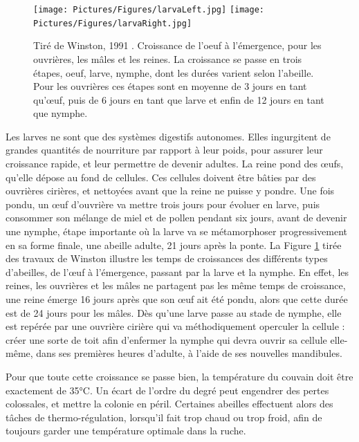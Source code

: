 			\begin{figure}
			\centering
			\texttt{[image: Pictures/Figures/larvaLeft.jpg]}
			\texttt{[image: Pictures/Figures/larvaRight.jpg]}
			\caption[Tirée de Winston, 1991 \cite{winston_biology_1991}. Croissance de l'oeuf à l'émergence, pour les ouvrières, les mâles et les reines.]{Tiré de Winston, 1991 \cite{winston_biology_1991}. Croissance de l'oeuf à l'émergence, pour les ouvrières, les mâles et les reines. La croissance se passe en trois étapes, oeuf, larve, nymphe, dont les durées varient selon l'abeille. Pour les ouvrières ces étapes sont en moyenne de 3 jours en tant qu'œuf, puis de 6 jours en tant que larve et enfin de 12 jours en tant que nymphe.}
			\label{LarvaDev}
			\end{figure}
			
			Les larves ne sont que des systèmes digestifs autonomes. Elles ingurgitent de grandes quantités de nourriture par rapport à leur poids, pour assurer leur croissance rapide, et leur permettre de devenir adultes. La reine pond des œufs, qu'elle dépose au fond de cellules. Ces cellules doivent être bâties par des ouvrières cirières, et nettoyées avant que la reine ne puisse y pondre. Une fois pondu, un œuf d'ouvrière va mettre trois jours pour évoluer en larve, puis consommer son mélange de miel et de pollen pendant six jours, avant de devenir une nymphe, étape importante où la larve va se métamorphoser progressivement en sa forme finale, une abeille adulte, 21 jours après la ponte. La Figure \ref{LarvaDev} tirée des travaux de Winston \cite{winston_biology_1991} illustre les temps de croissances des différents types d'abeilles, de l'œuf à l'émergence, passant par la larve et la nymphe. En effet, les reines, les ouvrières et les mâles ne partagent pas les même temps de croissance, une reine émerge 16 jours après que son œuf ait été pondu, alors que cette durée est de 24 jours pour les mâles. Dès qu'une larve passe au stade de nymphe, elle est repérée par une ouvrière cirière qui va méthodiquement operculer la cellule : créer une sorte de toit afin d'enfermer la nymphe qui devra ouvrir sa cellule elle-même, dans ses premières heures d'adulte, à l'aide de ses nouvelles mandibules.
			
			Pour que toute cette croissance se passe bien, la température du couvain doit être exactement de 35°C. Un écart de l'ordre du degré peut engendrer des pertes colossales, et mettre la colonie en péril. Certaines abeilles effectuent alors des tâches de thermo-régulation, lorsqu'il fait trop chaud ou trop froid, afin de toujours garder une température optimale dans la ruche.

